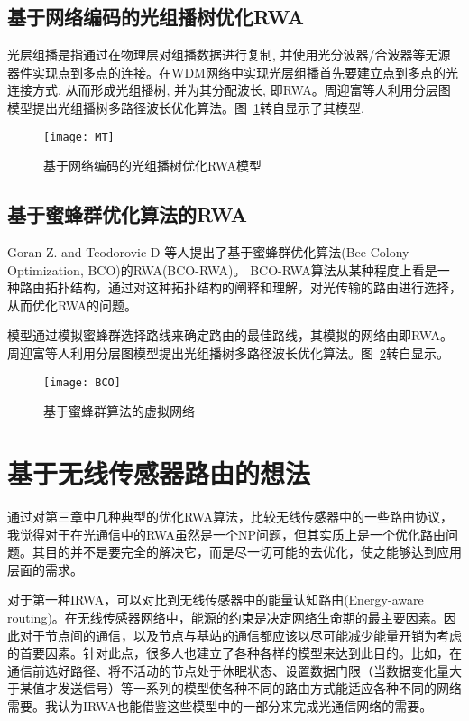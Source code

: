 \documentclass[11pt,twocolumn]{ctexart}
\begin{document}
\subsection{基于网络编码的光组播树优化RWA}
光层组播是指通过在物理层对组播数据进行复制, 并使用光分波器/合波器等无源器件实现点到多点的连接。在WDM网络中实现光层组播首先要建立点到多点的光连接方式, 从而形成光组播树, 并为其分配波长, 即RWA。周迎富等人利用分层图模型提出光组播树多路径波长优化算法。图~\ref{MT}转自\cite{8}显示了其模型.
\begin{figure}[!hbtp]
  \begin{center}
  \texttt{[image: MT]}
  \end{center}
  \caption{基于网络编码的光组播树优化RWA模型}
  \label{MT}
\end{figure}

\subsection{基于蜜蜂群优化算法的RWA}
Goran Z. and Teodorovic D 等人提出了基于蜜蜂群优化算法(Bee Colony Optimization, BCO)的RWA(BCO-RWA)。\cite{6} BCO-RWA算法从某种程度上看是一种路由拓扑结构，通过对这种拓扑结构的阐释和理解，对光传输的路由进行选择，从而优化RWA的问题。

模型通过模拟蜜蜂群选择路线来确定路由的最佳路线，其模拟的网络由即RWA。周迎富等人利用分层图模型提出光组播树多路径波长优化算法。图~\ref{BCO}转自\cite{6}显示。
\begin{figure}[!hbtp]
  \begin{center}
  \texttt{[image: BCO]}
  \end{center}
  \caption{基于蜜蜂群算法的虚拟网络}
  \label{BCO}
\end{figure}

\section{基于无线传感器路由的想法}
通过对第三章中几种典型的优化RWA算法，比较无线传感器中的一些路由协议，我觉得对于在光通信中的RWA虽然是一个NP问题，但其实质上是一个优化路由问题。其目的并不是要完全的解决它，而是尽一切可能的去优化，使之能够达到应用层面的需求。

对于第一种IRWA，可以对比到无线传感器中的能量认知路由(Energy-aware routing)。在无线传感器网络中，能源的约束是决定网络生命期的最主要因素。因此对于节点间的通信，以及节点与基站的通信都应该以尽可能减少能量开销为考虑的首要因素。针对此点，很多人也建立了各种各样的模型来达到此目的。比如，在通信前选好路径、将不活动的节点处于休眠状态、设置数据门限（当数据变化量大于某值才发送信号）等一系列的模型使各种不同的路由方式能适应各种不同的网络需要。我认为IRWA也能借鉴这些模型中的一部分来完成光通信网络的需要。
\end{document}
